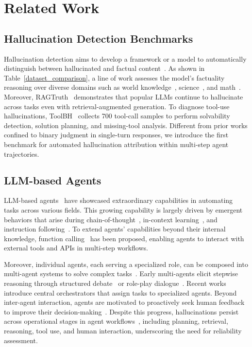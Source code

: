 \section{Related Work}
\label{sec:realted_work}

\subsection{Hallucination Detection Benchmarks}
Hallucination detection aims to develop a framework or a model to automatically distinguish between hallucinated and factual content~\cite{ li2025hd,ravichander2025halogen,qin2025learning,zhang2025icr,zhang2025prompt}. As shown in Table~\ref{dataset_comparison}, a line of work assesses the model’s factuality reasoning over diverse domains such as world knowledge~\cite{li2023halueval, wei2024long,bang2025hallulens}, science~\cite{zhao2023felm}, and math~\cite{zhao2023felm}. Moreover, RAGTruth~\cite{niu2024ragtruth} demonstrates that popular LLMs continue to hallucinate across tasks even with retrieval-augmented generation. To diagnose tool-use hallucinations, ToolBH~\cite{zhang2024toolbehonest} collects 700 tool-call samples to perform solvability detection, solution planning, and missing-tool analysis. Different from prior works confined to binary judgment in single-turn responses, we introduce the first benchmark for automated hallucination attribution within multi-step agent trajectories.

\subsection{LLM-based Agents}
LLM-based agents~\cite{yao2022react,wang2024executable} have showcased extraordinary capabilities in automating tasks across various fields. This growing capability is largely driven by emergent behaviors that arise during chain-of-thought~\cite{wei2022chain}, in-context learning~\cite{brown2020language}, and instruction following~\cite{longpre2023flan}. To extend agents' capabilities beyond their internal knowledge, function calling~\cite{schick2023toolformer,patil2024gorilla,patilberkeley} has been proposed, enabling agents to interact with external tools and APIs in multi-step workflows.

Moreover, individual agents, each serving a specialized role, can be composed into multi-agent systems to solve complex tasks~\cite{hong2023metagpt, wang2024openhands}. Early multi-agents elicit stepwise reasoning through structured debate~\cite{liang2024encouraging} or role-play dialogue~\cite{li2023camel}. Recent works~\cite{fourney2024magentic, hu2025owl} introduce central orchestrators that assign tasks to specialized agents. Beyond inter-agent interaction, agents are motivated to proactively seek human feedback to improve their decision-making~\cite{feng2024large}. Despite this progress, hallucinations persist across operational stages in agent workflows~\cite{lin2025llm}, including planning, retrieval, reasoning, tool use, and human interaction, underscoring the need for reliability assessment.






